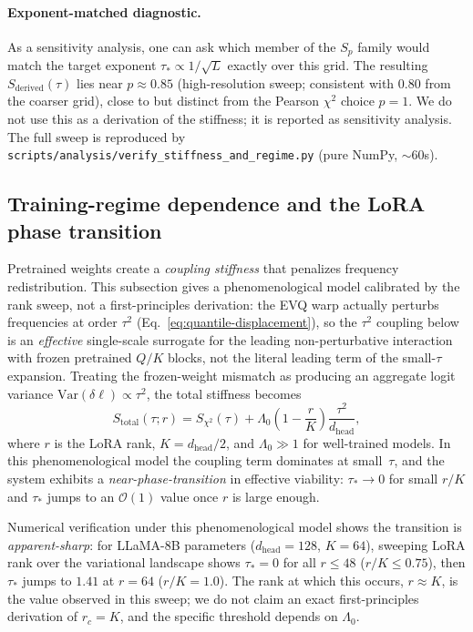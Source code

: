\paragraph{Exponent-matched diagnostic.} As a sensitivity analysis, one can ask which member of the $S_p$ family would match the target exponent $\tau_* \propto 1/\sqrt{L}$ exactly over this grid. The resulting $S_{\mathrm{derived}}(\tau)$ lies near $p \approx 0.85$ (high-resolution sweep; consistent with $0.80$ from the coarser grid), close to but distinct from the Pearson $\chi^2$ choice $p{=}1$. We do not use this as a derivation of the stiffness; it is reported as sensitivity analysis. The full sweep is reproduced by \texttt{scripts/analysis/verify\_stiffness\_and\_regime.py} (pure NumPy, ${\sim}60$s).

\subsection{Training-regime dependence and the LoRA phase transition}
\label{sec:lora-regime}

Pretrained weights create a \emph{coupling stiffness} that penalizes frequency redistribution. This subsection gives a phenomenological model calibrated by the rank sweep, not a first-principles derivation: the EVQ warp actually perturbs frequencies at order $\tau^2$ (Eq.~\eqref{eq:quantile-displacement}), so the $\tau^2$ coupling below is an \emph{effective} single-scale surrogate for the leading non-perturbative interaction with frozen pretrained $Q/K$ blocks, not the literal leading term of the small-$\tau$ expansion. Treating the frozen-weight mismatch as producing an aggregate logit variance $\mathrm{Var}(\delta\ell) \propto \tau^2$, the total stiffness becomes
\begin{equation}
S_{\mathrm{total}}(\tau; r) = S_{\chi^2}(\tau) + \Lambda_0\!\left(1 - \frac{r}{K}\right)\frac{\tau^2}{d_{\mathrm{head}}},
\end{equation}
where $r$ is the LoRA rank, $K = d_{\mathrm{head}}/2$, and $\Lambda_0 \gg 1$ for well-trained models. In this phenomenological model the coupling term dominates at small~$\tau$, and the system exhibits a \emph{near-phase-transition} in effective viability: $\tau_* \to 0$ for small $r/K$ and $\tau_*$ jumps to an $\mathcal{O}(1)$ value once $r$ is large enough.

Numerical verification under this phenomenological model shows the transition is \emph{apparent-sharp}: for LLaMA-8B parameters ($d_{\mathrm{head}}{=}128$, $K{=}64$), sweeping LoRA rank over the variational landscape shows $\tau_*{=}0$ for all $r \leq 48$ ($r/K \leq 0.75$), then $\tau_*$ jumps to $1.41$ at $r{=}64$ ($r/K{=}1.0$). The rank at which this occurs, $r \approx K$, is the value observed in this sweep; we do not claim an exact first-principles derivation of $r_c = K$, and the specific threshold depends on $\Lambda_0$.

